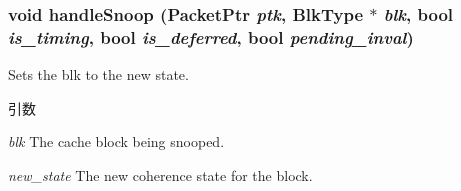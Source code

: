 \hypertarget{classCache_affa22df454ca8619381018b222c49c2d}{
\subsubsection[{handleSnoop}]{\setlength{\rightskip}{0pt plus 5cm}void handleSnoop ({\bf PacketPtr} {\em ptk}, \/  {\bf BlkType} $\ast$ {\em blk}, \/  bool {\em is\_\-timing}, \/  bool {\em is\_\-deferred}, \/  bool {\em pending\_\-inval})}}
\label{classCache_affa22df454ca8619381018b222c49c2d}
Sets the blk to the new state. 
\begin{DoxyParams}{引数}
\item[{\em blk}]The cache block being snooped. \item[{\em new\_\-state}]The new coherence state for the block. \end{DoxyParams}



